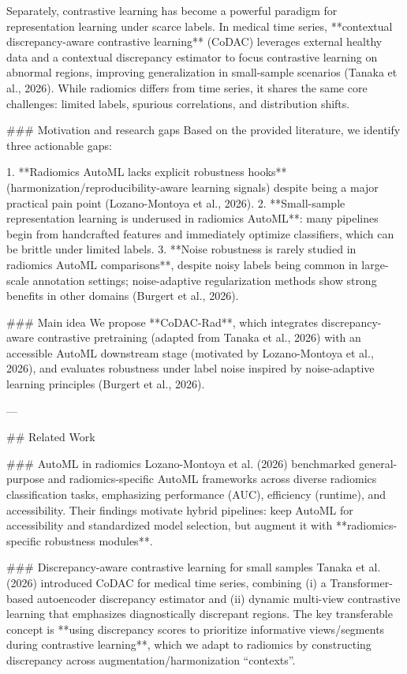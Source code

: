 Separately, contrastive learning has become a powerful paradigm for representation learning under scarce labels. In medical time series, **contextual discrepancy-aware contrastive learning** (CoDAC) leverages external healthy data and a contextual discrepancy estimator to focus contrastive learning on abnormal regions, improving generalization in small-sample scenarios (Tanaka et al., 2026). While radiomics differs from time series, it shares the same core challenges: limited labels, spurious correlations, and distribution shifts.

### Motivation and research gaps  
Based on the provided literature, we identify three actionable gaps:

1. **Radiomics AutoML lacks explicit robustness hooks** (harmonization/reproducibility-aware learning signals) despite being a major practical pain point (Lozano-Montoya et al., 2026).  
2. **Small-sample representation learning is underused in radiomics AutoML**: many pipelines begin from handcrafted features and immediately optimize classifiers, which can be brittle under limited labels.  
3. **Noise robustness is rarely studied in radiomics AutoML comparisons**, despite noisy labels being common in large-scale annotation settings; noise-adaptive regularization methods show strong benefits in other domains (Burgert et al., 2026).

### Main idea  
We propose **CoDAC-Rad**, which integrates discrepancy-aware contrastive pretraining (adapted from Tanaka et al., 2026) with an accessible AutoML downstream stage (motivated by Lozano-Montoya et al., 2026), and evaluates robustness under label noise inspired by noise-adaptive learning principles (Burgert et al., 2026).

---

## Related Work  

### AutoML in radiomics  
Lozano-Montoya et al. (2026) benchmarked general-purpose and radiomics-specific AutoML frameworks across diverse radiomics classification tasks, emphasizing performance (AUC), efficiency (runtime), and accessibility. Their findings motivate hybrid pipelines: keep AutoML for accessibility and standardized model selection, but augment it with **radiomics-specific robustness modules**.

### Discrepancy-aware contrastive learning for small samples  
Tanaka et al. (2026) introduced CoDAC for medical time series, combining (i) a Transformer-based autoencoder discrepancy estimator and (ii) dynamic multi-view contrastive learning that emphasizes diagnostically discrepant regions. The key transferable concept is **using discrepancy scores to prioritize informative views/segments during contrastive learning**, which we adapt to radiomics by constructing discrepancy across augmentation/harmonization “contexts”.

